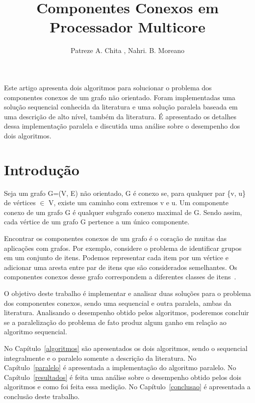 \documentclass[12pt]{article}
\title{Componentes Conexos em Processador Multicore}
\author{Patreze A. Chita \inst{1}, Nahri. B. Moreano\inst{1}}
\begin{document}
 


\maketitle
\begin{resumo} 
Este artigo apresenta dois algoritmos para solucionar o problema dos componentes conexos de um grafo não orientado. Foram implementadas uma solução sequencial conhecida da literatura e uma solução paralela baseada em uma descrição de alto nível, também da literatura. É apresentado os detalhes dessa implementação paralela e discutida uma análise sobre o desempenho dos dois algoritmos.
\end{resumo}

\section{Introdução}
Seja um grafo G=(V, E) não orientado, G é conexo se, para qualquer par \{v, u\} de vértices $\in$ V, existe um caminho com extremos v e u. Um componente conexo de um grafo G é qualquer subgrafo conexo maximal de G. Sendo assim, cada vértice de um grafo G pertence a um único componente.

Encontrar os componentes conexos de um grafo é o coração de muitas das aplicações com grafos. Por exemplo, considere o problema de identificar grupos em um conjunto de itens. Podemos representar cada item por um vértice e adicionar uma aresta entre par de itens que são considerados semelhantes. Os componentes conexos desse grafo correspondem a diferentes classes de itens~\cite{Skiena:2008}.

O objetivo deste trabalho é implementar e analisar duas soluções para o problema dos componentes conexos, sendo uma sequencial e outra paralela, ambas da literatura. Analisando o desempenho obtido pelos algoritmos, poderemos concluir se a paralelização do problema de fato produz algum ganho em relação ao algoritmo sequencial.

No Capítulo~\ref{algoritmos} são apresentados os dois algoritmos, sendo o sequencial integralmente e o paralelo somente a descrição da literatura. No Capítulo~\ref{paralelo} é apresentada a implementação do algoritmo paralelo. No Capítulo~\ref{resultados} é feita uma análise sobre o desempenho obtido pelos dois algoritmos e como foi feita essa medição. No Capítulo~\ref{conclusao} é apresentada a conclusão deste trabalho.
\end{document}
